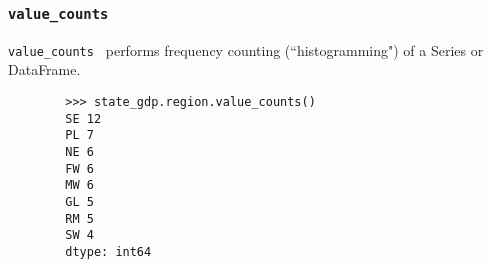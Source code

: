 \documentclass[KSmain.tex]{subfiles}
\begin{document}
	\subsubsection*{\texttt{value\_counts}}
	\texttt{value\_counts } performs frequency counting (``histogramming") of a Series or DataFrame.
	
	\begin{framed}
		\begin{verbatim}
		>>> state_gdp.region.value_counts()
		SE 12
		PL 7
		NE 6
		FW 6
		MW 6
		GL 5
		RM 5
		SW 4
		dtype: int64
		\end{verbatim}
	\end{framed}
	
	
	
\end{document}
